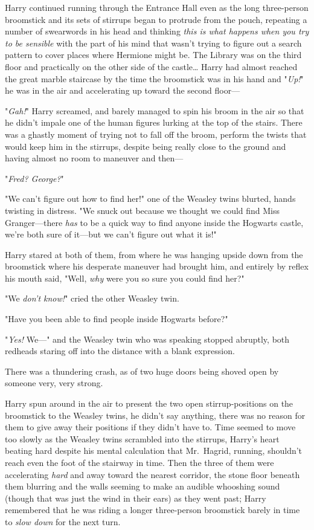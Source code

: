 Harry continued running through the Entrance Hall even as the long three-person 
broomstick and its sets of stirrups began to protrude from the pouch, repeating 
a number of swearwords in his head and thinking \emph{this is what happens when 
you try to be sensible} with the part of his mind that wasn't trying to figure 
out a search pattern to cover places where Hermione might be. The Library was 
on the third floor and practically on the other side of the castle{\ldots} 
Harry had almost reached the great marble staircase by the time the broomstick 
was in his hand and "\emph{Up!}" he was in the air and accelerating up toward 
the second floor---

"\emph{Gah!}" Harry screamed, and barely managed to spin his broom in the air 
so that he didn't impale one of the human figures lurking at the top of the 
stairs. There was a ghastly moment of trying not to fall off the broom, perform 
the twists that would keep him in the stirrups, despite being really close to 
the ground and having almost no room to maneuver and then---

"\emph{Fred? George?}"

"We can't figure out how to find her!" one of the Weasley twins blurted, hands 
twisting in distress. "We snuck out because we thought we could find Miss 
Granger---there \emph{has} to be a quick way to find anyone inside the Hogwarts 
castle, we're both sure of it---but we can't figure out what it is!"

Harry stared at both of them, from where he was hanging upside down from the 
broomstick where his desperate maneuver had brought him, and entirely by reflex 
his mouth said, "Well, \emph{why} were you so sure you could find her?"

"We \emph{don't know!}" cried the other Weasley twin.

"Have you been able to find people inside Hogwarts before?"

"\emph{Yes!} We---" and the Weasley twin who was speaking stopped abruptly, 
both redheads staring off into the distance with a blank expression.

There was a thundering crash, as of two huge doors being shoved open by someone 
very, very strong.

Harry spun around in the air to present the two open stirrup-positions on the 
broomstick to the Weasley twins, he didn't say anything, there was no reason 
for them to give away their positions if they didn't have to. Time seemed to 
move too slowly as the Weasley twins scrambled into the stirrups, Harry's heart 
beating hard despite his mental calculation that Mr.~Hagrid, running, shouldn't 
reach even the foot of the stairway in time. Then the three of them were 
accelerating \emph{hard} and away toward the nearest corridor, the stone floor 
beneath them blurring and the walls seeming to make an audible whooshing sound 
(though that was just the wind in their ears) as they went past; Harry 
remembered that he was riding a longer three-person broomstick barely in time 
to \emph{slow down} for the next turn.

